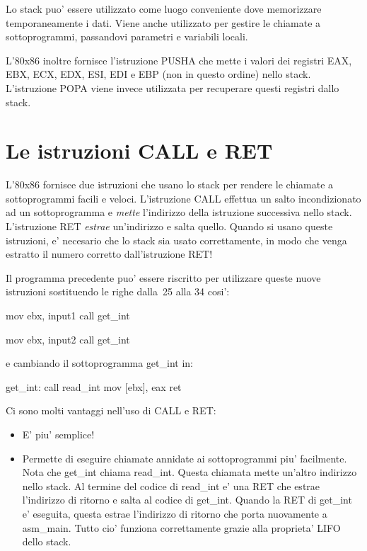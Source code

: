 Lo stack puo' essere utilizzato come luogo conveniente dove memorizzare
temporaneamente i dati. Viene anche utilizzato per gestire le chiamate
a sottoprogrammi, passandovi parametri e variabili locali.

L'80x86 inoltre fornisce l'istruzione {\code PUSHA} che mette i valori
dei registri EAX, EBX, ECX, EDX, ESI, EDI e EBP (non in questo ordine)
nello stack. L'istruzione {\code POPA} viene invece utilizzata per 
recuperare questi registri dallo stack.

\section{Le istruzioni CALL e RET}
L'80x86 fornisce due istruzioni che usano lo stack per rendere le
chiamate a sottoprogrammi facili e veloci. L'istruzione CALL effettua
un salto incondizionato ad un sottoprogramma e \emph{mette} l'indirizzo 
della istruzione successiva nello stack. L'istruzione RET \emph{estrae}
un'indirizzo e salta  quello. Quando si usano queste istruzioni, e' 
necesario che lo stack sia usato correttamente, in modo che venga
estratto il numero corretto dall'istruzione RET!

Il programma precedente puo' essere riscritto per utilizzare queste nuove
istruzioni sostituendo le righe dalla~25 alla 34 cosi':
\begin{AsmCodeListing}[numbers=none]
      mov    ebx, input1
      call   get_int

      mov    ebx, input2
      call   get_int
\end{AsmCodeListing}
e cambiando il sottoprogramma {\code get\_int} in:
\begin{AsmCodeListing}[numbers=none]
get_int:
      call   read_int
      mov    [ebx], eax
      ret
\end{AsmCodeListing}

Ci sono molti vantaggi nell'uso di CALL e RET:
\begin{itemize}
\item E' piu' semplice!
\item Permette di eseguire chiamate annidate ai sottoprogrammi piu' facilmente.
Nota che {\code get\_int} chiama {\code read\_int}. Questa chiamata mette
un'altro indirizzo nello stack. Al termine del codice di {\code read\_int} e'
una RET che estrae l'indirizzo di ritorno e salta al codice di {\code get\_int}.
Quando la RET di {\code get\_int} e' eseguita, questa estrae l'indirizzo di 
ritorno che porta nuovamente a {\code asm\_main}. Tutto cio' funziona correttamente
grazie alla proprieta' LIFO dello stack.
\end{itemize}


